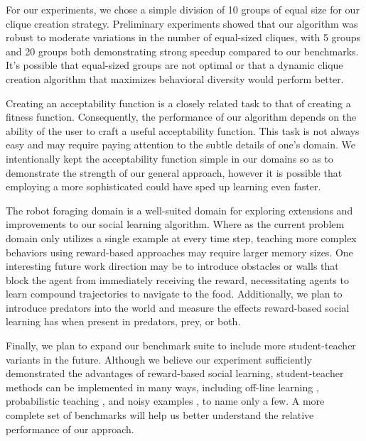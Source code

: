 \documentclass{acm_proc_article-sp}
\begin{document}
For our experiments, we chose a simple division of 10 groups of equal size for our clique creation strategy. Preliminary experiments showed that our algorithm was robust to moderate variations in the number of equal-sized cliques, with 5 groups and 20 groups both demonstrating strong speedup compared to our benchmarks. It's possible that equal-sized groups are not optimal or that a dynamic clique creation algorithm that maximizes behavioral diversity would perform better.

Creating an acceptability function is a closely related task to that of creating a fitness function. Consequently, the performance of our algorithm depends on the ability of the user to craft a useful acceptability function. This task is not always easy and may require paying attention to the subtle details of one's domain. We intentionally kept the acceptability function simple in our domains so as to demonstrate the strength of our general approach, however it is possible that employing a more sophisticated could have sped up learning even faster.

The robot foraging domain is a well-suited domain for exploring extensions and improvements to our social learning algorithm. Where as the current problem domain only utilizes a single example at every time step, teaching more complex behaviors using reward-based approaches may require larger memory sizes. One interesting future work direction may be to introduce obstacles or walls that block the agent from immediately receiving the reward, necessitating agents to learn compound trajectories to navigate to the food. Additionally, we plan to introduce predators into the world and measure the effects reward-based social learning has when present in predators, prey, or both.

Finally, we plan to expand our benchmark suite to include more student-teacher variants in the future. Although we believe our experiment sufficiently demonstrated the advantages of reward-based social learning, student-teacher methods can be implemented in many ways, including off-line learning \cite{acerbi2007social}, probabilistic teaching \cite{haasdijk2008social}, and noisy examples \cite{denaro1996cultural}, to name only a few. A more complete set of benchmarks will help us better understand the relative performance of our approach.

\end{document}
